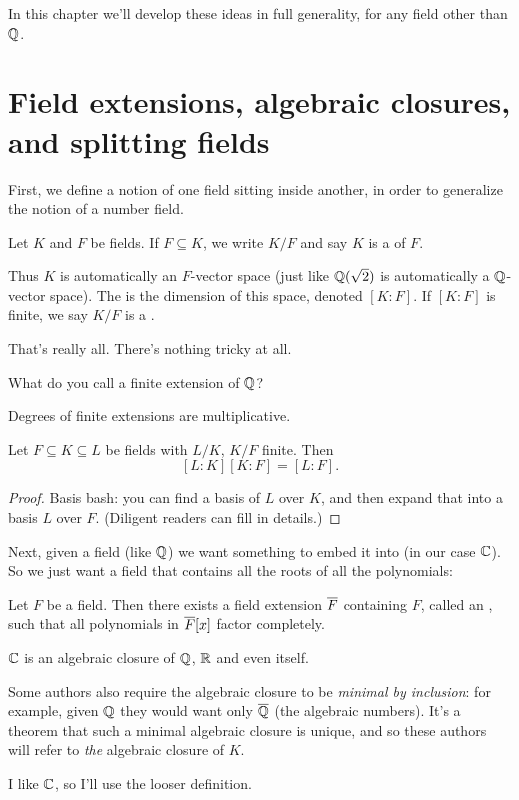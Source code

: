 In this chapter we'll develop these ideas in full generality, for any field other than $\mathbb Q$.

\section{Field extensions, algebraic closures, and splitting fields}

First, we define a notion of one field sitting inside another,
in order to generalize the notion of a number field.
\begin{definition}
	Let $K$ and $F$ be fields.
	If $F \subseteq K$, we write $K/F$ and say $K$ is a
	 of $F$.
	
	Thus $K$ is automatically an $F$-vector space
	(just like $\mathbb Q(\sqrt 2)$ is automatically a $\mathbb Q$-vector space).
	The  is the dimension of this space, denoted $[K:F]$.
	If $[K:F]$ is finite, we say $K/F$ is a .
\end{definition}
That's really all. There's nothing tricky at all.

\begin{ques}
	What do you call a finite extension of $\mathbb Q$?
\end{ques}

Degrees of finite extensions are multiplicative.
\begin{theorem}
	Let $F \subseteq K \subseteq L$ be fields with $L/K$, $K/F$ finite. Then
	\[ [L:K][K:F] = [L:F]. \]
\end{theorem}
\begin{proof}
	Basis bash: you can find a basis of $L$ over $K$,
	and then expand that into a basis $L$ over $F$.
	(Diligent readers can fill in details.)
\end{proof}

Next, given a field (like $\mathbb Q$) we want something to embed it into (in our case $\CC$).
So we just want a field that contains all the roots of all the polynomials:
\begin{theorem}
	Let $F$ be a field.
	Then there exists a field extension $\overline F$ containing $F$, called an ,
	such that all polynomials in $\overline F[x]$ factor completely.
\end{theorem}
\begin{example}
	[$\CC$]
	$\CC$ is an algebraic closure of $\mathbb Q$, $\mathbb R$ and even itself.
\end{example}
\begin{abuse}
	Some authors also require the algebraic closure to be \emph{minimal by inclusion}:
	for example, given $\mathbb Q$ they would want only $\overline{\mathbb Q}$ (the algebraic numbers).
	It's a theorem that such a minimal algebraic closure is unique,
	and so these authors will refer to \emph{the} algebraic closure of $K$.

	I like $\CC$, so I'll use the looser definition.
\end{abuse}

